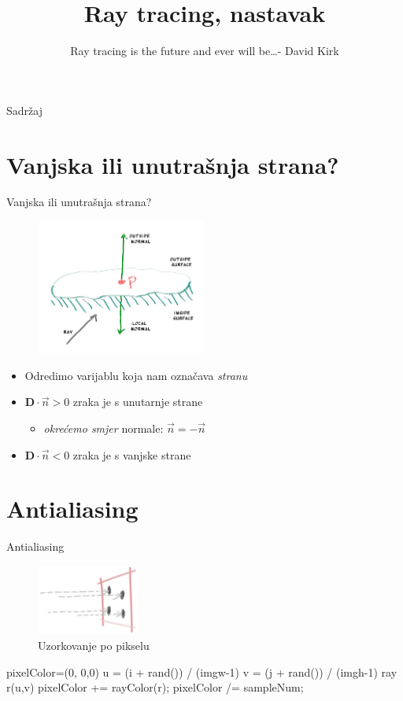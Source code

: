 \documentclass[9pt]{beamer}
\title{Ray tracing, nastavak}
\subtitle{Ray tracing is the future and ever will be\ldots - David Kirk}
\institute{Računalna grafika}
\begin{document}
\begin{frame}
	\titlepage
\end{frame}

\begin{frame}{Sadržaj}
\tableofcontents
\end{frame}
\section{Vanjska ili unutrašnja strana?}
\begin{frame}{Vanjska ili unutrašnja strana?}
\begin{figure}
	\includegraphics[width=0.5\textwidth]{./slike/normal-possibilities.png}
\end{figure}
\begin{itemize}
	\item Odredimo varijablu koja nam označava \textit{stranu}
	\item $\mathbf{D}\cdot \vec{n} >0$ zraka je s unutarnje strane
	\begin{itemize}
		\item \textit{okrećemo smjer} normale: $\vec{n} = -\vec{n}$
	\end{itemize}
	\item $\mathbf{D}\cdot \vec{n} <0$ zraka je s vanjske strane
\end{itemize}
\end{frame}

\section{Antialiasing}
\begin{frame}{Antialiasing}
\begin{figure}
	\includegraphics[width=0.3\textwidth]{./slike/pixel-samples.png}
	\caption{Uzorkovanje po pikselu}
\end{figure}
\begin{algorithm}[H]
	{
		pixelColor=(0, 0,0)\;
		{
			u = (i + rand()) / (imgw-1)\;
			v = (j + rand()) / (imgh-1)\;
			ray r(u,v)\;
			pixelColor += rayColor(r);
		}
		pixelColor /= sampleNum;
	}
\end{algorithm}
\end{frame}
\end{document}
